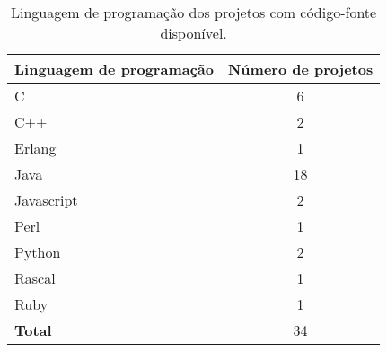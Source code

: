 \begin{table}[h]
\caption{Linguagem de programação dos projetos com código-fonte disponível.}
\centering
\begin{tabular}{l c}
  \hline
  {\bf Linguagem de programação} & {\bf Número de projetos} \\
  \hline
  C & 6 \\
  C++ & 2 \\
  Erlang & 1 \\
  Java & 18 \\
  Javascript & 2 \\
  Perl & 1 \\
  Python & 2 \\
  Rascal & 1 \\
  Ruby & 1 \\
  \hline
  {\bf Total} & 34 \\
  \hline
\end{tabular}
\label{source-code-table}
\end{table}

